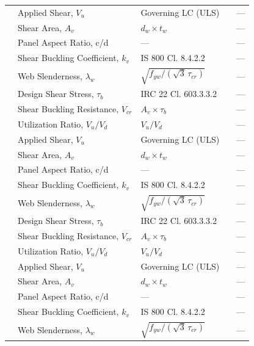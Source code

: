 \documentclass[12pt,a4paper]{report}
\numberwithin{table}{chapter}
\numberwithin{figure}{chapter}
\begin{document}
\begin{longtable}{|C{2.5cm}|C{3.5cm}|C{3.5cm}|>{\centering\arraybackslash}p{4.2cm}|C{1.8cm}|}
\hline
\endlastfoot
{} & Applied Shear, $V_u$ & Governing LC (ULS) &  & --- \\[6pt]
 & Shear Area, $A_v$ & $d_w \times t_w$ &  & --- \\[6pt]
 & Panel Aspect Ratio, c/d & --- &  & --- \\[6pt]
 & Shear Buckling Coefficient, $k_v$ & IS 800 Cl. 8.4.2.2 &  & --- \\[6pt]
 & Web Slenderness, $\lambda_w$ & $\sqrt{f_{yw}/(\sqrt{3}\,\tau_{cr})}$ &  & --- \\[6pt]
 & Design Shear Stress, $\tau_b$ & IRC 22 Cl. 603.3.3.2 &  & --- \\[6pt]
 & Shear Buckling Resistance, $V_{cr}$ & $A_v \times \tau_b$ &  & --- \\[6pt]
 & Utilization Ratio, $V_u / V_d$ & $V_u / V_d$ &  & --- \\[6pt]
\hline
{} & Applied Shear, $V_u$ & Governing LC (ULS) &  & --- \\[6pt]
 & Shear Area, $A_v$ & $d_w \times t_w$ &  & --- \\[6pt]
 & Panel Aspect Ratio, c/d & --- &  & --- \\[6pt]
 & Shear Buckling Coefficient, $k_v$ & IS 800 Cl. 8.4.2.2 &  & --- \\[6pt]
 & Web Slenderness, $\lambda_w$ & $\sqrt{f_{yw}/(\sqrt{3}\,\tau_{cr})}$ &  & --- \\[6pt]
 & Design Shear Stress, $\tau_b$ & IRC 22 Cl. 603.3.3.2 &  & --- \\[6pt]
 & Shear Buckling Resistance, $V_{cr}$ & $A_v \times \tau_b$ &  & --- \\[6pt]
 & Utilization Ratio, $V_u / V_d$ & $V_u / V_d$ &  & --- \\[6pt]
\hline
{} & Applied Shear, $V_u$ & Governing LC (ULS) &  & --- \\[6pt]
 & Shear Area, $A_v$ & $d_w \times t_w$ &  & --- \\[6pt]
 & Panel Aspect Ratio, c/d & --- &  & --- \\[6pt]
 & Shear Buckling Coefficient, $k_v$ & IS 800 Cl. 8.4.2.2 &  & --- \\[6pt]
 & Web Slenderness, $\lambda_w$ & $\sqrt{f_{yw}/(\sqrt{3}\,\tau_{cr})}$ &  & --- \\[6pt]

\end{longtable}
\end{document}
